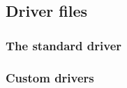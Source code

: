 \subsection{Driver files}
\label{sec:cross-compiler-driver-file}

\subsubsection{The standard driver}
\label{sec:cross-compiler-standard-driver}

\subsubsection{Custom drivers}
\label{sec:cross-compiler-custom-drivers}



 


